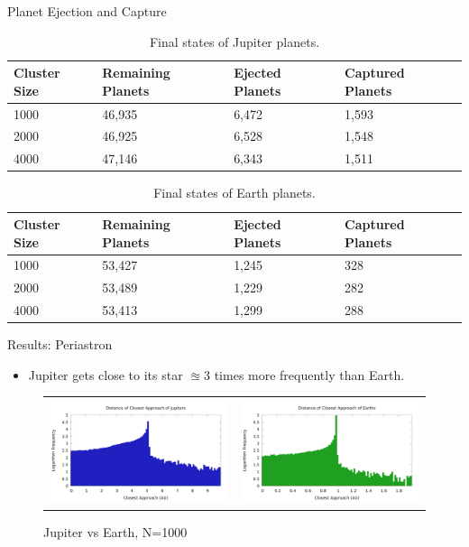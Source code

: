 \documentclass{beamer}
\begin{document}
\begin{frame}{Planet Ejection and Capture}
    \begin{table}[H]
        \centering
        \tiny
        \caption{Final states of Jupiter planets.}
        \begin{tabular}{|llll|}
            \hline
            \textbf{Cluster Size} & \textbf{Remaining Planets} & \textbf{Ejected Planets} & \textbf{Captured Planets} \\
            \hline
            1000 & 46,935 & 6,472 & 1,593 \\
            2000 & 46,925 & 6,528 & 1,548 \\
            4000 & 47,146 & 6,343 & 1,511 \\
            \hline
        \end{tabular}
    \end{table}
    \begin{table}[H]
        \centering
        \tiny
        \caption{Final states of Earth planets.}
        \begin{tabular}{|llll|}
            \hline
            \textbf{Cluster Size} & \textbf{Remaining Planets} & \textbf{Ejected Planets} & \textbf{Captured Planets} \\
            \hline
            1000 & 53,427 & 1,245 & 328 \\
            2000 & 53,489 & 1,229 & 282 \\
            4000 & 53,413 & 1,299 & 288 \\
            \hline
        \end{tabular}
    \end{table}
\end{frame}

\begin{frame}{Results: Periastron}
    \begin{itemize}
        \item Jupiter gets close to its star $\approxeq 3$ times more frequently than Earth.
    \end{itemize}
    \begin{figure}
        \centering
        \caption{Jupiter vs Earth, N=1000}
        \begin{tabular}{cc}
            \includegraphics[height=1.20in]{periastron_jupiter_1000.png} &
            \includegraphics[height=1.20in]{periastron_earth_1000.png}
        \end{tabular}
    \end{figure}
\end{frame}
\end{document}
